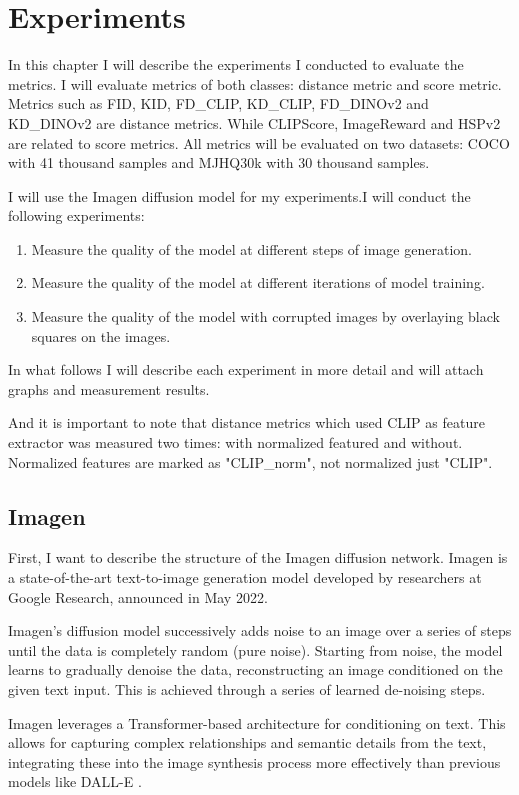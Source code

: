 \chapter{Experiments}
In this chapter I will describe the experiments I conducted to evaluate the metrics. I will evaluate metrics of both classes: distance metric and score metric. Metrics such as FID, KID, FD\_CLIP, KD\_CLIP, FD\_DINOv2 and KD\_DINOv2 are distance metrics. While CLIPScore, ImageReward and HSPv2 are related to score metrics. All metrics will be evaluated on two datasets: COCO with 41 thousand samples and MJHQ30k with 30 thousand samples.

I will use the Imagen\cite{Imagen} diffusion model for my experiments.I will conduct the following experiments:
\begin{enumerate}
    \item Measure the quality of the model at different steps of image generation.
    \item Measure the quality of the model at different iterations of model training.
    \item Measure the quality of the model with corrupted images by overlaying black squares on the images.
\end{enumerate}
In what follows I will describe each experiment in more detail and will attach graphs and measurement results.

And it is important to note that distance metrics which used CLIP as feature extractor was measured two times: with normalized featured and without. Normalized features are marked as "CLIP\_norm", not normalized just "CLIP".
\section{Imagen}
First, I want to describe the structure of the Imagen\cite{Imagen} diffusion network. Imagen is a state-of-the-art text-to-image generation model developed by researchers at Google Research, announced in May 2022.

Imagen's diffusion model successively adds noise to an image over a series of steps until the data is completely random (pure noise). Starting from noise, the model learns to gradually denoise the data, reconstructing an image conditioned on the given text input. This is achieved through a series of learned de-noising steps.


Imagen leverages a Transformer-based \cite{Visual_transformer} architecture for conditioning on text. This allows for capturing complex relationships and semantic details from the text, integrating these into the image synthesis process more effectively than previous models like DALL-E \cite{DALLE}.


